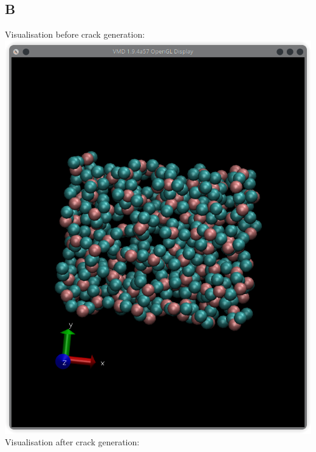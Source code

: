 \documentclass[11pt]{article}
\begin{document}
\subsection{B}
Visualisation before crack generation:\\
\includegraphics[scale=0.5]{Q3b_FF_Crack.png}\\
Visualisation after crack generation:\\
\end{document}

